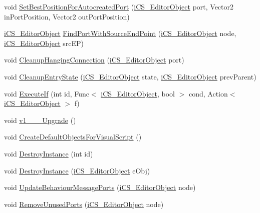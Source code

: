 \begin{DoxyCompactItemize}
\item 
void \hyperlink{classi_c_s___i_storage_aa7f4589ab0fbe9d668fd098d7036a777}{Set\+Best\+Position\+For\+Autocreated\+Port} (\hyperlink{classi_c_s___editor_object}{i\+C\+S\+\_\+\+Editor\+Object} port, Vector2 in\+Port\+Position, Vector2 out\+Port\+Position)
\item 
\hyperlink{classi_c_s___editor_object}{i\+C\+S\+\_\+\+Editor\+Object} \hyperlink{classi_c_s___i_storage_a7ead83bab05aa504fc4abc364c66a486}{Find\+Port\+With\+Source\+End\+Point} (\hyperlink{classi_c_s___editor_object}{i\+C\+S\+\_\+\+Editor\+Object} node, \hyperlink{classi_c_s___editor_object}{i\+C\+S\+\_\+\+Editor\+Object} src\+E\+P)
\item 
void \hyperlink{classi_c_s___i_storage_ac3ef1916f0f80cd478dd4ff36c68b38a}{Cleanup\+Hanging\+Connection} (\hyperlink{classi_c_s___editor_object}{i\+C\+S\+\_\+\+Editor\+Object} port)
\item 
void \hyperlink{classi_c_s___i_storage_aea8130693a561d907e56d42d958cd32c}{Cleanup\+Entry\+State} (\hyperlink{classi_c_s___editor_object}{i\+C\+S\+\_\+\+Editor\+Object} state, \hyperlink{classi_c_s___editor_object}{i\+C\+S\+\_\+\+Editor\+Object} prev\+Parent)
\item 
void \hyperlink{classi_c_s___i_storage_aa7354782e9df068932f8e3a37ece41c6}{Execute\+If} (int id, Func$<$ \hyperlink{classi_c_s___editor_object}{i\+C\+S\+\_\+\+Editor\+Object}, bool $>$ cond, Action$<$ \hyperlink{classi_c_s___editor_object}{i\+C\+S\+\_\+\+Editor\+Object} $>$ f)
\item 
void \hyperlink{classi_c_s___i_storage_af4ef0f8f99f726641b35264d69bd2c90}{v1\+\_\+\_\+\_\+\+Upgrade} ()
\item 
void \hyperlink{classi_c_s___i_storage_a8c7111e4d4144f1183f192b2c9acf453}{Create\+Default\+Objects\+For\+Visual\+Script} ()
\item 
void \hyperlink{classi_c_s___i_storage_a659bc3eff1e095f7cab0c335cffb6108}{Destroy\+Instance} (int id)
\item 
void \hyperlink{classi_c_s___i_storage_a612e6f7ca19082b97ab7068437814406}{Destroy\+Instance} (\hyperlink{classi_c_s___editor_object}{i\+C\+S\+\_\+\+Editor\+Object} e\+Obj)
\item 
void \hyperlink{classi_c_s___i_storage_ae151582c3dfa743aed55c2725da8f400}{Update\+Behaviour\+Message\+Ports} (\hyperlink{classi_c_s___editor_object}{i\+C\+S\+\_\+\+Editor\+Object} node)
\item 
void \hyperlink{classi_c_s___i_storage_a3a5a0e7889b25b9be93c60d500da7db7}{Remove\+Unused\+Ports} (\hyperlink{classi_c_s___editor_object}{i\+C\+S\+\_\+\+Editor\+Object} node)

\end{DoxyCompactItemize}
